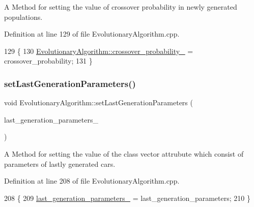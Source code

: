 A Method for setting the value of crossover probability in newly generated populations. 



Definition at line 129 of file Evolutionary\+Algorithm.\+cpp.


\begin{DoxyCode}
129                                                                                  \{
130     \hyperlink{classEvolutionaryAlgorithm_a815be8b2644e2d1bdc6378c88ab03da3}{EvolutionaryAlgorithm::crossover\_probability\_} = 
      crossover\_probability;
131 \}
\end{DoxyCode}
\mbox{\label{classEvolutionaryAlgorithm_accd59515cc111edb66a030e7f8d79099}} 
\subsubsection{\texorpdfstring{set\+Last\+Generation\+Parameters()}{setLastGenerationParameters()}}
{\footnotesize\ttfamily void Evolutionary\+Algorithm\+::set\+Last\+Generation\+Parameters (\begin{DoxyParamCaption}\item[{const std\+::vector$<$ \hyperlink{classCarParameters}{Car\+Parameters} $>$ \&}]{last\+\_\+generation\+\_\+parameters\+\_\+ }\end{DoxyParamCaption})}



A Method for setting the value of the class vector attrubute which consist of parameters of lastly generated cars. 



Definition at line 208 of file Evolutionary\+Algorithm.\+cpp.


\begin{DoxyCode}
208                                                                                                            
             \{
209     \hyperlink{classEvolutionaryAlgorithm_a85d23b07f2b2c8b1df581a9566111fa7}{last\_generation\_parameters\_} = last\_generation\_parameters;
210 \}
\end{DoxyCode}
\mbox{\label{classEvolutionaryAlgorithm_a2f47cbcc3c2b886ece5ba97bbfed4178}} 

